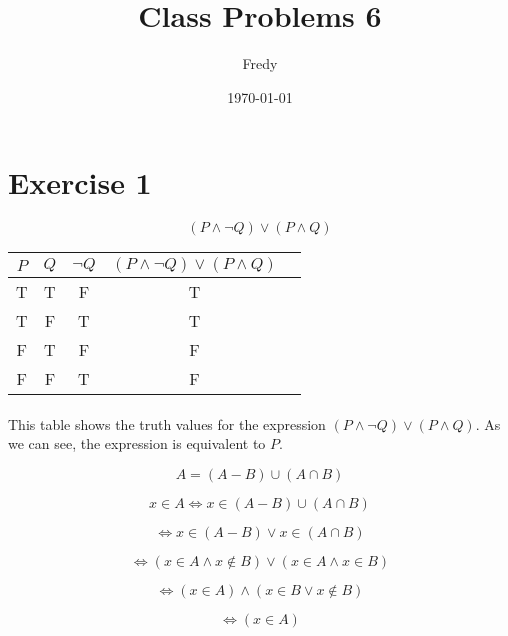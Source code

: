 \documentclass{article}
\title{Class Problems 6}
\author{Fredy}
\date{\today}
\begin{document}
\maketitle

\section*{Exercise 1}
\[
  (P \land \neg Q) \lor (P \land Q)
\]

\begin{tabular}{|c|c|c|c|c|}
  \hline
  $P$ & $Q$ & $\neg Q$ & $(P \land \neg Q) \lor (P \land Q)$ \\
  \hline
  T   & T   & F        & T                                   \\
  \hline
  T   & F   & T        & T                                   \\
  \hline
  F   & T   & F        & F                                   \\
  \hline
  F   & F   & T        & F                                   \\
  \hline
\end{tabular}

\paragraph{}
This table shows the truth values for the expression $(P \land \neg Q) \lor (P \land Q)$. As we can see, the expression is equivalent to $P$.

\[
  A = (A - B) \cup (A \cap B)
\]

\[
  x \in A \iff x \in (A - B) \cup (A \cap B)
\]

\[
  \iff x \in (A - B) \lor x \in (A \cap B)
\]

\[
  \iff (x \in A \land x \notin B) \lor (x \in A \land x \in B)
\]

\[
  \iff (x \in A) \land (x \in B \lor x \notin B)
\]

\[
  \iff (x \in A)
\]
\end{document}
